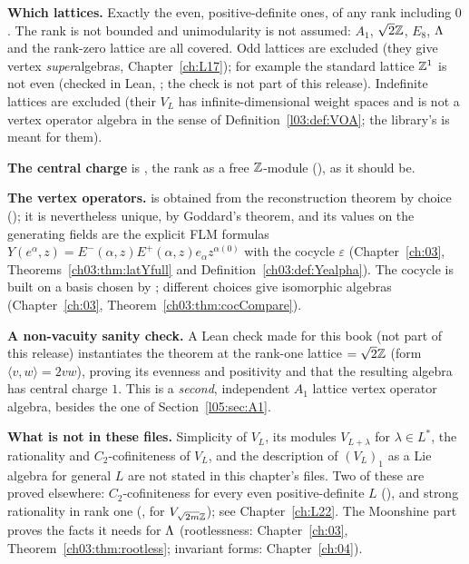 \begin{dictionary}
\textbf{Which lattices.} Exactly the even, positive-definite ones, of any rank including $0$. The rank is
not bounded and unimodularity is not assumed: $A_1$, $\sqrt2{\mathbb{Z}}$, $E_8$, ${\Lambda}$ and the rank-zero lattice are all
covered. Odd lattices are excluded (they give vertex \emph{super}algebras, Chapter~\ref{ch:L17}); for example the
standard lattice ${\mathbb{Z}}^1$ is not even (checked in Lean, ; the check is not part of this release). Indefinite lattices are excluded
(their $V_L$ has infinite-dimensional weight spaces and is not a vertex operator algebra in the sense of
Definition~\ref{l03:def:VOA}; the library's  is meant for them).

\textbf{The central charge} is , the rank as a free ${\mathbb{Z}}$-module (), as it
should be.

\textbf{The vertex operators.}  is obtained from the reconstruction theorem by choice
(); it is nevertheless unique, by Goddard's theorem, and its values on the generating fields are
the explicit FLM formulas $Y(e^\alpha,z)=E^-(\alpha,z)E^+(\alpha,z)e_\alpha z^{\alpha(0)}$ with the cocycle
$\varepsilon$ (Chapter~\ref{ch:03}, Theorems~\ref{ch03:thm:latYfull} and Definition~\ref{ch03:def:Yealpha}).
The cocycle is built on a basis chosen by ; different choices give isomorphic
algebras (Chapter~\ref{ch:03}, Theorem~\ref{ch03:thm:cocCompare}).

\textbf{A non-vacuity sanity check.} A Lean check made for this book (not part of this release)
instantiates the theorem at the rank-one lattice  $=\sqrt2{\mathbb{Z}}$ (form $\langle v,w\rangle=2vw$),
proving its evenness and positivity and that the resulting algebra  has central charge
$1$. This is a \emph{second}, independent $A_1$ lattice vertex operator algebra, besides the one of
Section~\ref{l05:sec:A1}.

\textbf{What is not in these files.} Simplicity of $V_L$, its modules $V_{L+\lambda}$ for $\lambda\in L^*$, the
rationality and $C_2$-cofiniteness of $V_L$, and the description of $(V_L)_1$ as a Lie algebra for general $L$
are not stated in this chapter's files. Two of these are proved elsewhere: $C_2$-cofiniteness for every even
positive-definite $L$ (), and strong rationality in rank one
(, for $V_{\sqrt{2m}{\mathbb{Z}}}$); see Chapter~\ref{ch:L22}. The Moonshine part proves the facts it needs for ${\Lambda}$ (rootlessness:
Chapter~\ref{ch:03}, Theorem~\ref{ch03:thm:rootless}; invariant forms: Chapter~\ref{ch:04}).
\end{dictionary}

